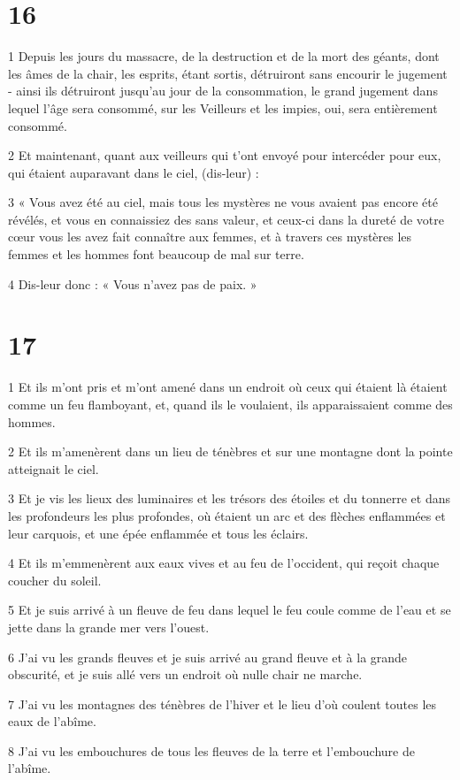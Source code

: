 \chapter{16}

\par 1 Depuis les jours du massacre, de la destruction et de la mort des géants, dont les âmes de la chair, les esprits, étant sortis, détruiront sans encourir le jugement - ainsi ils détruiront jusqu'au jour de la consommation, le grand jugement dans lequel l'âge sera consommé, sur les Veilleurs et les impies, oui, sera entièrement consommé.
\par 2 Et maintenant, quant aux veilleurs qui t'ont envoyé pour intercéder pour eux, qui étaient auparavant dans le ciel, (dis-leur) :
\par 3 « Vous avez été au ciel, mais tous les mystères ne vous avaient pas encore été révélés, et vous en connaissiez des sans valeur, et ceux-ci dans la dureté de votre cœur vous les avez fait connaître aux femmes, et à travers ces mystères les femmes et les hommes font beaucoup de mal sur terre.
\par 4 Dis-leur donc : « Vous n'avez pas de paix. »

\chapter{17}

\par 1 Et ils m'ont pris et m'ont amené dans un endroit où ceux qui étaient là étaient comme un feu flamboyant, et, quand ils le voulaient, ils apparaissaient comme des hommes.
\par 2 Et ils m'amenèrent dans un lieu de ténèbres et sur une montagne dont la pointe atteignait le ciel.
\par 3 Et je vis les lieux des luminaires et les trésors des étoiles et du tonnerre et dans les profondeurs les plus profondes, où étaient un arc et des flèches enflammées et leur carquois, et une épée enflammée et tous les éclairs.
\par 4 Et ils m'emmenèrent aux eaux vives et au feu de l'occident, qui reçoit chaque coucher du soleil.
\par 5 Et je suis arrivé à un fleuve de feu dans lequel le feu coule comme de l'eau et se jette dans la grande mer vers l'ouest.
\par 6 J'ai vu les grands fleuves et je suis arrivé au grand fleuve et à la grande obscurité, et je suis allé vers un endroit où nulle chair ne marche.
\par 7 J'ai vu les montagnes des ténèbres de l'hiver et le lieu d'où coulent toutes les eaux de l'abîme.
\par 8 J'ai vu les embouchures de tous les fleuves de la terre et l'embouchure de l'abîme.

